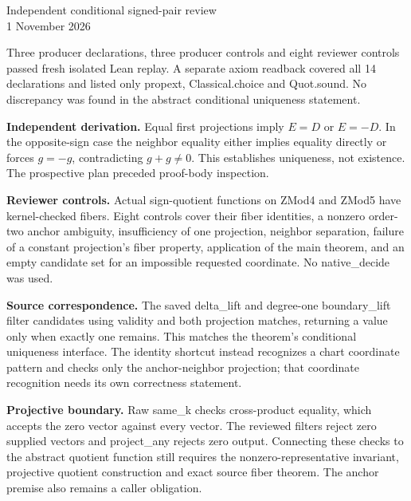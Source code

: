 \documentclass[11pt]{article}
\begin{document}
\begin{center}{\Large Independent conditional signed-pair review}\\1 November 2026\end{center}
Three producer declarations, three producer controls and eight reviewer controls passed fresh isolated Lean replay. A separate axiom readback covered all 14 declarations and listed only propext, Classical.choice and Quot.sound. No discrepancy was found in the abstract conditional uniqueness statement.
\begin{center}\end{center}
\textbf{Independent derivation.} Equal first projections imply $E=D$ or $E=-D$. In the opposite-sign case the neighbor equality either implies equality directly or forces $g=-g$, contradicting $g+g\ne0$. This establishes uniqueness, not existence. The prospective plan preceded proof-body inspection.

\textbf{Reviewer controls.} Actual sign-quotient functions on ZMod4 and ZMod5 have kernel-checked fibers. Eight controls cover their fiber identities, a nonzero order-two anchor ambiguity, insufficiency of one projection, neighbor separation, failure of a constant projection's fiber property, application of the main theorem, and an empty candidate set for an impossible requested coordinate. No native\_decide was used.

\textbf{Source correspondence.} The saved delta\_lift and degree-one boundary\_lift filter candidates using validity and both projection matches, returning a value only when exactly one remains. This matches the theorem's conditional uniqueness interface. The identity shortcut instead recognizes a chart coordinate pattern and checks only the anchor-neighbor projection; that coordinate recognition needs its own correctness statement.

\textbf{Projective boundary.} Raw same\_k checks cross-product equality, which accepts the zero vector against every vector. The reviewed filters reject zero supplied vectors and project\_any rejects zero output. Connecting these checks to the abstract quotient function still requires the nonzero-representative invariant, projective quotient construction and exact source fiber theorem. The anchor premise also remains a caller obligation.
\end{document}
